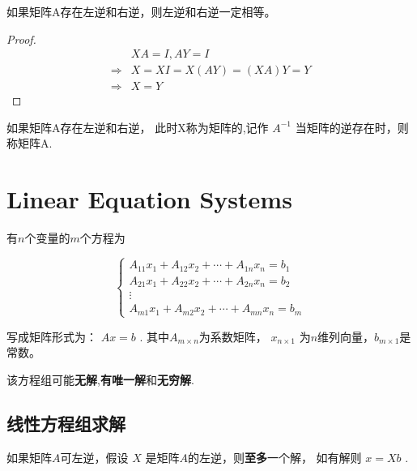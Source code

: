 \begin{theorem}
    如果矩阵A存在左逆和右逆，则左逆和右逆一定相等。
\end{theorem}

\begin{proof}
    \begin{equation}
    \begin{aligned}
    &X A=I, A Y=I  \\
    \Rightarrow&  X=X I=X(A Y)=(X A) Y=Y \\
    \Rightarrow& X=Y
    \end{aligned}
\end{equation}
\end{proof}

\begin{definition}[逆 $A^{-1}$]
    如果矩阵A存在左逆和右逆， 此时X称为矩阵的,记作 $ A^{-1} $ 当矩阵的逆存在时，则称矩阵A.
\end{definition}

\section{Linear Equation Systems}

\begin{definition}
    有$n$个变量的$m$个方程为

    \begin{equation} \left\{\begin{array}{c}A_{11} x_{1}+A_{12} x_{2}+\cdots+A_{1 n} x_{n}=b_{1} \\ A_{21} x_{1}+A_{22} x_{2}+\cdots+A_{2 n} x_{n}=b_{2} \\ \vdots \\ A_{m 1} x_{1}+A_{m 2} x_{2}+\cdots+A_{m n} x_{n}=b_{m}\end{array}\right. \end{equation}

    写成矩阵形式为： $  {A} x= {b} $ . 其中$A_{m \times n}$为系数矩阵， $ x_{n \times 1} $ 为$n$维列向量，$b_{m \times 1}$是常数。 
\end{definition}

该方程组可能\textbf{无解},\textbf{有唯一解}和\textbf{无穷解}.

\subsection{线性方程组求解}

\begin{theorem}
    如果矩阵$A$可左逆，假设 $ X $ 是矩阵$A$的左逆，则\textbf{至多}一个解， 如有解则 $ x=X b $ . 
\end{theorem}

